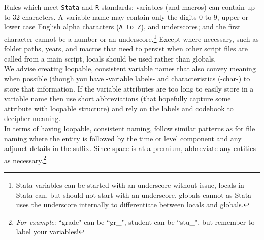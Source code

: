 Rules which meet \texttt{Stata} and \texttt{R} standards:  variables (and macros) can contain up to \textsf{32} characters. A variable name may contain only the digits 0 to 9, upper or lower case English alpha characters (\texttt{A to Z}), and underscores; and the first character cannot be a number or an underscore.\footnote{Stata variables can be started with an underscore without issue, locals in Stata can, but should not start with an underscore, globals cannot as Stata uses the underscore internally to differentiate between locals and globals.} Except where necessary, such as folder paths, years, and macros that need to persist when other script files are called from a main script, locals should be used rather than globals. \\

We advise creating \textsf{loopable}, consistent variable names that also convey meaning when possible (though you have -variable labels- and characteristics (-char-) to store that information. If the variable attributes are too long to easily store in a variable name then use short abbreviations (that hopefully capture some attribute with loopable structure) and rely on the labels and codebook to decipher meaning. \\

In terms of having loopable, consistent naming, follow similar patterns as for file naming where the entity is followed by the time or level component and any adjunct details in the suffix. Since space is at a premium, abbreviate any entities as necessary.\footnote{\textit{For example}: ``grade" can be ``gr\_", student can be ``stu\_", but remember to label your variables!}

